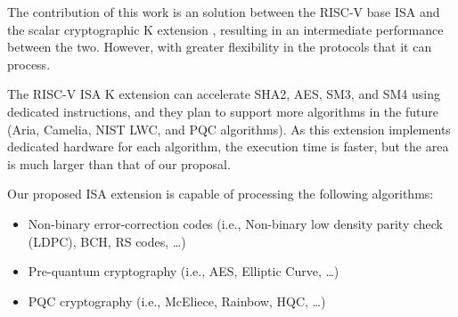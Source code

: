 The contribution of this work is an solution between the RISC-V base ISA and the scalar cryptographic K extension \cite{zehrisc}, resulting in an 
intermediate performance between the two. However, with greater flexibility in the protocols that it can process. 

The RISC-V ISA K extension can accelerate SHA2, AES, SM3, and SM4 using dedicated instructions, and they plan to support more algorithms 
in the future (Aria, Camelia, NIST LWC, and PQC algorithms). As this extension implements dedicated hardware for each algorithm, the execution time is faster, but the area is much larger than that of our proposal.

Our proposed ISA extension is capable of processing the following algorithms:

\begin{itemize}
    \item Non-binary error-correction codes (i.e., Non-binary low density parity check (LDPC), BCH, RS codes, \dots)
    \item Pre-quantum cryptography (i.e., AES, Elliptic Curve, \dots)
    \item PQC cryptography (i.e., McEliece, Rainbow, HQC, \dots)
\end{itemize}


